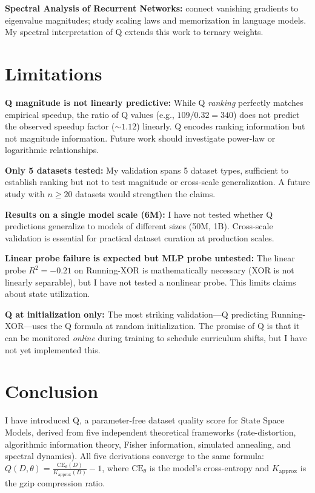 \documentclass{article}
\begin{document}
\textbf{Spectral Analysis of Recurrent Networks:} \citet{pascanu2013difficulty} connect vanishing gradients to eigenvalue magnitudes; \citet{henighan2023scaling} study scaling laws and memorization in language models. My spectral interpretation of Q extends this work to ternary weights.

\section{Limitations}

\textbf{Q magnitude is not linearly predictive:} While Q \emph{ranking} perfectly matches empirical speedup, the ratio of Q values (e.g., $109 / 0.32 = 340$) does not predict the observed speedup factor ($\sim 1.12$) linearly. Q encodes ranking information but not magnitude information. Future work should investigate power-law or logarithmic relationships.

\textbf{Only 5 datasets tested:} My validation spans 5 dataset types, sufficient to establish ranking but not to test magnitude or cross-scale generalization. A future study with $n \geq 20$ datasets would strengthen the claims.

\textbf{Results on a single model scale (6M):} I have not tested whether Q predictions generalize to models of different sizes (50M, 1B). Cross-scale validation is essential for practical dataset curation at production scales.

\textbf{Linear probe failure is expected but MLP probe untested:} The linear probe $R^2 = -0.21$ on Running-XOR is mathematically necessary (XOR is not linearly separable), but I have not tested a nonlinear probe. This limits claims about state utilization.

\textbf{Q at initialization only:} The most striking validation---Q predicting Running-XOR---uses the Q formula at random initialization. The promise of Q is that it can be monitored \emph{online} during training to schedule curriculum shifts, but I have not yet implemented this.

\section{Conclusion}

I have introduced Q, a parameter-free dataset quality score for State Space Models, derived from five independent theoretical frameworks (rate-distortion, algorithmic information theory, Fisher information, simulated annealing, and spectral dynamics). All five derivations converge to the same formula: $Q(D, \theta) = \frac{\mathrm{CE}_\theta(D)}{K_{\mathrm{approx}}(D)} - 1$, where $\mathrm{CE}_\theta$ is the model's cross-entropy and $K_{\mathrm{approx}}$ is the gzip compression ratio.
\end{document}
